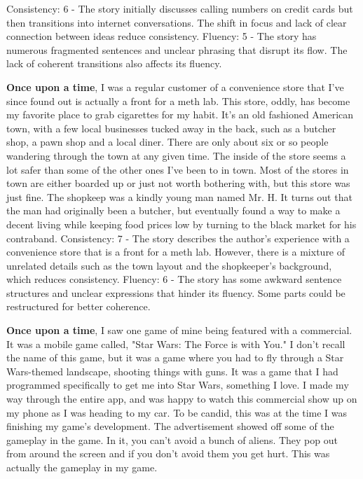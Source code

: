 \documentclass{article}
\begin{document}
Consistency: 6 - The story initially discusses calling numbers on credit cards but then transitions into internet conversations. The shift in focus and lack of clear connection between ideas reduce consistency.
Fluency: 5 - The story has numerous fragmented sentences and unclear phrasing that disrupt its flow. The lack of coherent transitions also affects its fluency.

\textbf{Once upon a time}, I was a regular customer of a convenience store that I've since found out is actually a front for a meth lab. This store, oddly, has become my favorite place to grab cigarettes for my habit. It's an old fashioned American town, with a few local businesses tucked away in the back, such as a butcher shop, a pawn shop and a local diner. There are only about six or so people wandering through the town at any given time. The inside of the store seems a lot safer than some of the other ones I've been to in town. Most of the stores in town are either boarded up or just not worth bothering with, but this store was just fine. The shopkeep was a kindly young man named Mr. H. It turns out that the man had originally been a butcher, but eventually found a way to make a decent living while keeping food prices low by turning to the black market for his contraband.
Consistency: 7 - The story describes the author's experience with a convenience store that is a front for a meth lab. However, there is a mixture of unrelated details such as the town layout and the shopkeeper's background, which reduces consistency.
Fluency: 6 - The story has some awkward sentence structures and unclear expressions that hinder its fluency. Some parts could be restructured for better coherence.

\textbf{Once upon a time}, I saw one game of mine being featured with a commercial. It was a mobile game called, "Star Wars: The Force is with You." I don't recall the name of this game, but it was a game where you had to fly through a Star Wars-themed landscape, shooting things with guns. It was a game that I had programmed specifically to get me into Star Wars, something I love. I made my way through the entire app, and was happy to watch this commercial show up on my phone as I was heading to my car. To be candid, this was at the time I was finishing my game's development. The advertisement showed off some of the gameplay in the game. In it, you can't avoid a bunch of aliens. They pop out from around the screen and if you don't avoid them you get hurt. This was actually the gameplay in my game.
\end{document}
